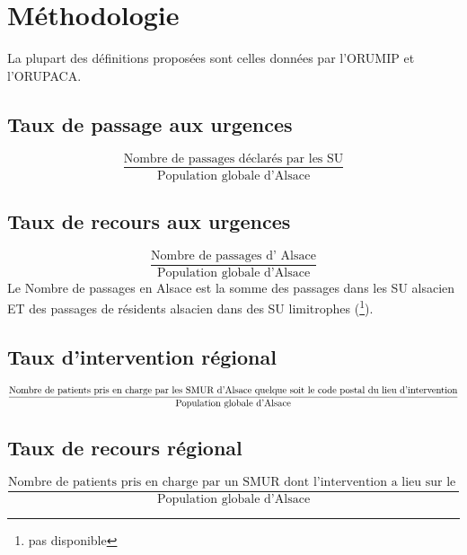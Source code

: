 \documentclass[12pt,english,french,twoside]{report}\usepackage[]{graphicx}\usepackage[]{color}
\begin{document}
\newpage
\appendix
\chapter{Méthodologie}


La plupart des définitions proposées sont celles données par l'ORUMIP et l'ORUPACA.

\section*{Taux de passage aux urgences}
  \begin{displaymath}
    \frac{\text{Nombre de passages déclarés par les SU}}{\text{Population globale d'Alsace}}
  \end{displaymath}

\section*{Taux de recours aux urgences}
\begin{displaymath}
    \frac{\text{Nombre de passages d' Alsace}}{\text{Population globale d'Alsace}}
  \end{displaymath}
Le Nombre de passages en Alsace est la somme des passages dans les SU alsacien ET des passages de résidents alsacien dans des SU limitrophes (\footnote{pas disponible}).

\section*{Taux d'intervention régional}
\begin{displaymath}
    \frac{\text{Nombre de patients pris en charge par les SMUR d'Alsace}\linebreak[4] \text{ quelque soit le code postal du lieu d'intervention}}{\text{Population globale d'Alsace}}
  \end{displaymath}

\section*{Taux de recours régional}
\begin{displaymath}
    \frac{\text{Nombre de patients pris en charge par un SMUR dont l'intervention a lieu sur le territoire régional }}{\text{Population globale d'Alsace}}
  \end{displaymath}
\end{document}
